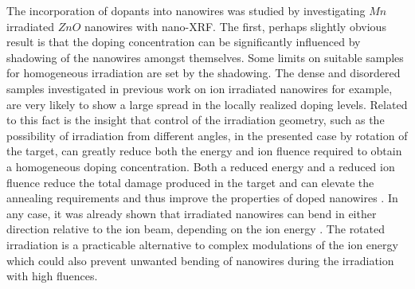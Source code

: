The incorporation of dopants into nanowires was studied by investigating $Mn$ irradiated $ZnO$ nanowires with nano-XRF. The first, perhaps slightly obvious result is that the doping concentration can be significantly influenced by shadowing of the nanowires amongst themselves. Some limits on suitable samples for homogeneous irradiation are set by the shadowing. The dense and disordered samples investigated in previous work on ion irradiated nanowires \cite{geburt_rare_2008,ronning_ion_2010,kaiser_defect_2011,geburt_lasing_2012,geburt_intense_2013,kaiser_luminescence_2013,geburt_intense_2014,chu_nano-x-ray_2014} for example, are very likely to show a large spread in the locally realized doping levels. Related to this fact is the insight that control of the irradiation geometry, such as the possibility of irradiation from different angles, in the presented case by rotation of the target, can greatly reduce both the energy and ion fluence required to obtain a homogeneous doping concentration. Both a reduced energy and a reduced ion fluence reduce the total damage produced in the target and can elevate the annealing requirements and thus improve the properties of doped nanowires \cite{borschel_new_2011,paschoal_hopping_2012,borschel_ion-solid_2012,kumar_magnetic_2013,paschoal_magnetoresistance_2014}. In any case, it was already shown that irradiated nanowires can bend in either direction relative to the ion beam, depending on the ion energy \cite{borschel_permanent_2011}. The rotated irradiation is a practicable alternative to complex modulations of the ion energy which could also prevent unwanted bending of nanowires during the irradiation with high fluences.


